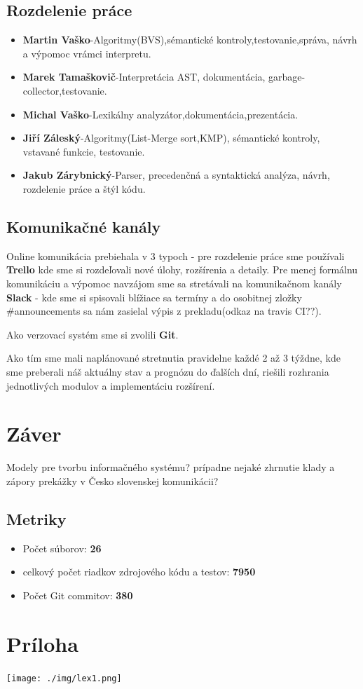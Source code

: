 \documentclass[12pt,a4paper]{report}
\begin{document}
\section{Rozdelenie práce}
\begin{itemize}
\item \textbf{Martin Vaško}-Algoritmy(BVS),sémantické kontroly,testovanie,správa, návrh a výpomoc vrámci interpretu.
\item \textbf{Marek Tamaškovič}-Interpretácia AST, dokumentácia, garbage-collector,testovanie.
\item \textbf{Michal Vaško}-Lexikálny analyzátor,dokumentácia,prezentácia.
\item \textbf{Jiří Záleský}-Algoritmy(List-Merge sort,KMP), sémantické kontroly, vstavané funkcie, testovanie.
\item \textbf{Jakub Zárybnický}-Parser, precedenčná a syntaktická analýza, návrh, rozdelenie práce a štýl kódu.
\end{itemize}

\section{Komunikačné kanály}
\par Online komunikácia prebiehala v 3 typoch - pre rozdelenie práce sme používali \textbf{Trello} kde sme si rozdeľovali nové úlohy, rozšírenia a detaily. Pre menej formálnu komunikáciu a výpomoc navzájom sme sa stretávali na komunikačnom kanály \textbf{Slack} - kde sme si spisovali blížiace sa termíny a do osobitnej zložky \#announcements sa nám zasielal výpis z prekladu(odkaz na travis CI??).
\par Ako verzovací systém sme si zvolili \textbf{Git}.
\par Ako tím sme mali naplánované stretnutia pravidelne každé 2 až 3 týždne, kde sme preberali náš aktuálny stav a prognózu do ďalších dní, riešili rozhrania jednotlivých modulov a implementáciu rozšírení.

\chapter{Záver}
Modely pre tvorbu informačného systému? prípadne nejaké zhrnutie klady a zápory prekážky v Česko slovenskej komunikácii?
\section{Metriky}

\begin{itemize}
\item Počet súborov: \textbf{26}
\item celkový počet riadkov zdrojového kódu a testov: \textbf{7950}
\item Počet Git commitov: \textbf{380}
\end{itemize}


\chapter{Príloha}
\texttt{[image: ./img/lex1.png]}\\
\end{document}
